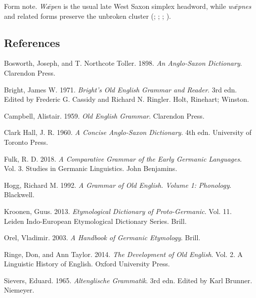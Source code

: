 \documentclass[
  british,
  a4paper,
]{article}
\newlength{\cslhangindent}
\newenvironment{CSLReferences}[2] %
 {\begin{list}{}{%
  \setlength{\itemindent}{0pt}
  \setlength{\leftmargin}{0pt}
  \setlength{\parsep}{0pt}
  \ifodd #1
   \setlength{\leftmargin}{\cslhangindent}
   \setlength{\itemindent}{-1\cslhangindent}
  \fi
  \setlength{\itemsep}{#2\baselineskip}}}
 {\end{list}}
\begin{document}
Form note. \emph{Wǣpen} is the usual late West Saxon simplex headword,
while \emph{wǣpnes} and related forms preserve the unbroken cluster
(;
;
;
).

\clearpage

\subsection*{References}\label{references}

\protect{}\label{refs}
\begin{CSLReferences}{1}{1}
Bosworth, Joseph, and T. Northcote Toller. 1898. \emph{An {Anglo-Saxon}
Dictionary}. Clarendon Press.

Bright, James W. 1971. \emph{Bright's {Old English} Grammar and Reader}.
3rd edn. Edited by Frederic G. Cassidy and Richard N. Ringler. Holt,
Rinehart; Winston.

Campbell, Alistair. 1959. \emph{Old {English} Grammar}. Clarendon Press.

Clark Hall, J. R. 1960. \emph{A Concise {Anglo-Saxon} Dictionary}. 4th
edn. University of Toronto Press.

Fulk, R. D. 2018. \emph{A Comparative Grammar of the Early {Germanic}
Languages}. Vol. 3. Studies in Germanic Linguistics. John Benjamins.

Hogg, Richard M. 1992. \emph{A Grammar of Old English. Volume 1:
Phonology}. Blackwell.

Kroonen, Guus. 2013. \emph{Etymological Dictionary of {Proto-Germanic}}.
Vol. 11. Leiden Indo-European Etymological Dictionary Series. Brill.

Orel, Vladimir. 2003. \emph{A Handbook of {Germanic} Etymology}. Brill.

Ringe, Don, and Ann Taylor. 2014. \emph{The Development of {Old
English}}. Vol. 2. A Linguistic History of English. Oxford University
Press.

Sievers, Eduard. 1965. \emph{Altenglische Grammatik}. 3rd edn. Edited by
Karl Brunner. Niemeyer.

\end{CSLReferences}
\end{document}
